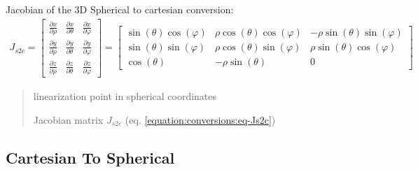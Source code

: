 \documentclass[letterpaper,10pt,english]{sphinxmanual}
\begin{document}
\begin{fulllineitems}
\label{\detokenize{conversions:conversions.J_s2c}}
\pysigstartsignatures
{}
\pysigstopsignatures
\sphinxAtStartPar
Jacobian of the 3D Spherical to cartesian conversion:
\begin{equation}\label{equation:conversions:eq-Js2c}
\begin{split}J_{s2c} = \begin{bmatrix} \frac{\partial x}{\partial \rho} & \frac{\partial x}{\partial \theta} & \frac{\partial x}{\partial \varphi} \\ \frac{\partial y}{\partial \rho} & \frac{\partial y}{\partial \theta} & \frac{\partial y}{\partial \varphi} \\ \frac{\partial z}{\partial \rho} & \frac{\partial z}{\partial \theta} & \frac{\partial z}{\partial \varphi} \end{bmatrix} = \begin{bmatrix} \sin(\theta)\cos(\varphi) & \rho\cos(\theta)\cos(\varphi) & -\rho\sin(\theta)\sin(\varphi) \\ \sin(\theta)\sin(\varphi) & \rho\cos(\theta)\sin(\varphi) & \rho\sin(\theta)\cos(\varphi) \\ \cos(\theta) & -\rho\sin(\theta) & 0 \end{bmatrix}\end{split}
\end{equation}\begin{quote}\begin{description}
\sphinxAtStartPar
{} \textendash{} linearization point in spherical coordinates

\sphinxAtStartPar
Jacobian matrix \(J_{s2c}\) (eq. \eqref{equation:conversions:eq-Js2c})

\end{description}\end{quote}

\end{fulllineitems}



\subsection{Cartesian To Spherical}
\label{\detokenize{conversions:cartesian-to-spherical}}
\end{document}
